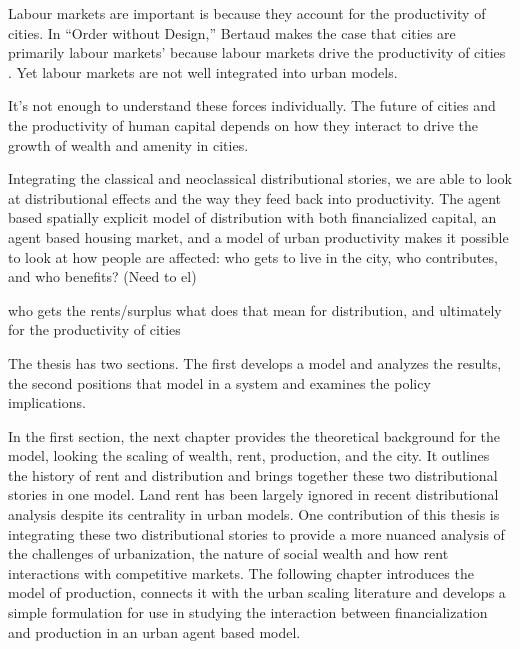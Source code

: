 Labour markets are important is because they account for the productivity of cities.
In ``Order without Design,'' Bertaud makes the case that cities are primarily labour markets' because labour markets drive the productivity of cities \cite{bertaudOrderDesignHow2018}. Yet labour markets are not well integrated into urban models. 

It's not enough to understand these forces individually. The future of cities and the productivity of human capital depends on how they interact to drive the growth of wealth and amenity in cities. 

Integrating the classical and neoclassical  distributional stories, we are able to look at distributional effects and the way they feed back into productivity. The agent based spatially explicit model of distribution with both financialized capital, an agent based housing market, and a model of urban productivity makes it possible to look at how people are affected: who gets to live in the city, who contributes, and who benefits? (Need to el)

who gets the rents/surplus what does that mean for distribution, and ultimately for the productivity of cities





The thesis has two sections. The first develops a model and analyzes the results, the second positions that model in a system and examines the policy implications.

In the first section,
the next chapter provides the theoretical background for the model, looking the scaling of wealth, rent, production, and the city. 
It outlines the history of rent and distribution and brings together these two distributional stories in one model. Land rent has been largely ignored in recent distributional analysis despite its centrality in urban models. One contribution of this thesis is integrating these two distributional stories to provide a more nuanced analysis of the challenges of urbanization, the nature of social wealth and how rent interactions with competitive markets. %
The following chapter introduces the model of production, connects it with the urban scaling literature and develops a simple formulation for use in studying the interaction between financialization and production in an urban agent based model.

